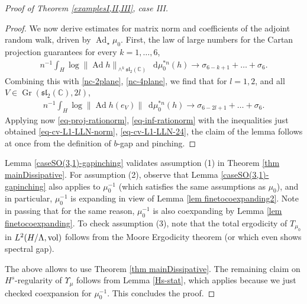 \documentclass[11pt, leqno, fleqn]{amsart}
\newcommand{\dd}{\,\mathrm{d}}
\DeclareMathOperator{\Gr}{Gr}
\newcommand{\C}{{\mathbb C}}
\theoremstyle{definition}
\theoremstyle{definition}
\DeclareMathOperator{\Ad}{Ad}
\def \vol{  {\rm vol} }
\begin{document}
\begin{proof}[Proof of Theorem \ref{examplesI,II,III}, case III]
\begin{proof}
			
			We now derive estimates for matrix norm and coefficients of the adjoint random walk, driven by  $\Ad_{\star}\mu_{0}$. First,  the law of large numbers for the Cartan projection 
			\cite[Theorem 13.17]{BQ} guarantees for every $k=1, \dots, 6$, 
			\begin{align}\label{eq-cv-L1-LLN-norm}
				n^{-1}\int_{H} \log \|\Ad h\|_{\wedge^k\mathfrak{sl}_{2}(\C)} \,\,\dd\mu_{0}^{*n}(h) \rightarrow \sigma_{6-k+1}+\dots +\sigma_{6}.
			\end{align}
			Combining this with \eqref{nc-2plane}, \eqref{nc-4plane}, we find that for   $l=1,2$, and all $V\in \Gr(\mathfrak{sl}_{2}(\C), 2l)$,
			\begin{align}\label{eq-cv-L1-LLN-24}
				n^{-1}\int_{H} \log \|\Ad h (e_{V})\| \,\,\dd\mu_{0}^{*n}(h) \rightarrow \sigma_{6-2l+1}+\dots +\sigma_{6}.
			\end{align}
			Applying now \eqref{eq-proj-rationorm}, \eqref{eq-inf-rationorm} with the inequalities just obtained \eqref{eq-cv-L1-LLN-norm}, \eqref{eq-cv-L1-LLN-24}, the claim of the lemma follows at once from the definition of $b$-gap and pinching.  
		\end{proof}
		
Lemma \ref{caseSO(3,1)-gapinching} validates assumption (1) in Theorem \ref{thm mainDissipative}. For assumption (2),	observe that Lemma \ref{caseSO(3,1)-gapinching} also applies to $\mu_{0}^{-1}$ (which satisfies the same assumptions as $\mu_{0}$), and in particular, $\mu_{0}^{-1}$ is  expanding in view of Lemma \ref{lem finetocoexpanding2}. Note in passing that for the same reason,  $\mu_{0}^{-1}$ is also coexpanding by Lemma  \ref{lem finetocoexpanding}. To check assumption (3), note that the total ergodicity of $T_{\mu_{0}}$ in $L^2(H/\Lambda, \vol)$ follows from the Moore Ergodicity theorem \cite[Theorem 2.2.6]{Zimmer} (or \cite{Bekka} which even shows spectral gap). 
	
	The above allows to use Theorem \ref{thm mainDissipative}. The remaining claim on $H^s$-regularity of $\Upsilon_{\mu}$ follows from Lemma \ref{Hs-stat}, which applies because we just checked coexpansion for $\mu^{-1}_{0}$. This concludes the proof.
	\end{proof}
	
\end{document}
